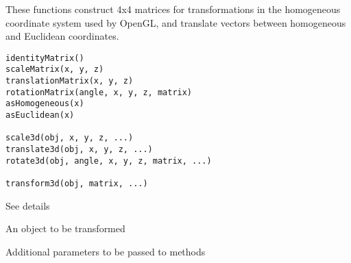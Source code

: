 \documentclass{article}
\begin{document}
\begin{Description}\relax
These functions construct 4x4 matrices for transformations
in the homogeneous coordinate system used by OpenGL, and translate
vectors between homogeneous and Euclidean coordinates.
\end{Description}
\begin{Usage}
\begin{verbatim}
identityMatrix()
scaleMatrix(x, y, z)
translationMatrix(x, y, z)
rotationMatrix(angle, x, y, z, matrix)
asHomogeneous(x)
asEuclidean(x)

scale3d(obj, x, y, z, ...)
translate3d(obj, x, y, z, ...)
rotate3d(obj, angle, x, y, z, matrix, ...)

transform3d(obj, matrix, ...)

\end{verbatim}
\end{Usage}
\begin{Arguments}
\begin{ldescription}
\item[\code{x, y, z, angle, matrix}] See details
\item[\code{obj}] An object to be transformed
\item[\code{...}] Additional parameters to be passed to methods
\end{ldescription}
\end{Arguments}
\end{document}
